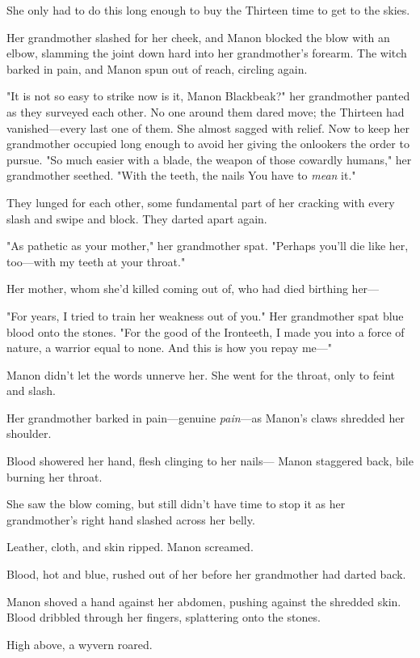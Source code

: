She only had to do this long enough to buy the Thirteen time to get to the skies.

Her grandmother slashed for her cheek, and Manon blocked the blow with an elbow, slamming the joint down hard into her grandmother's forearm. The witch barked in pain, and Manon spun out of reach, circling again.

"It is not so easy to strike now is it, Manon Blackbeak?" her grandmother panted as they surveyed each other. No one around them dared move; the Thirteen had vanished---every last one of them. She almost sagged with relief. Now to keep her grandmother occupied long enough to avoid her giving the onlookers the order to pursue. "So much easier with a blade, the weapon of those cowardly humans," her grandmother seethed. "With the teeth, the nails  You have to \emph{mean}
it."

They lunged for each other, some fundamental part of her cracking with every slash and swipe and block. They darted apart again.

"As pathetic as your mother," her grandmother spat. "Perhaps you'll die like her, too---with my teeth at your throat."

Her mother, whom she'd killed coming out of, who had died birthing her---

"For years, I tried to train her weakness out of you." Her grandmother spat blue blood onto the stones. "For the good of the Ironteeth, I made you into a force of nature, a warrior equal to none. And this is how you repay me---"

Manon didn't let the words unnerve her. She went for the throat, only to feint and slash.

Her grandmother barked in pain---genuine \emph{pain}---as Manon's claws shredded her shoulder.

Blood showered her hand, flesh clinging to her nails--- Manon staggered back, bile burning her throat.

She saw the blow coming, but still didn't have time to stop it as her grandmother's right hand slashed across her belly.

Leather, cloth, and skin ripped. Manon screamed.

Blood, hot and blue, rushed out of her before her grandmother had darted back.

Manon shoved a hand against her abdomen, pushing against the shredded skin. Blood dribbled through her fingers, splattering onto the stones.

High above, a wyvern roared.

